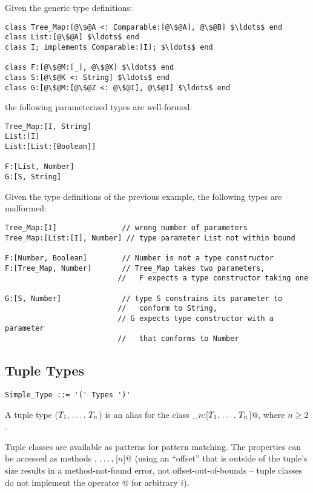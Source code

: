 \example
\label{example:parameterized-types}
Given the generic type definitions: 

\begin{lstlisting}[escapechar=@]
class Tree_Map:[@\$@A <: Comparable:[@\$@A], @\$@B] $\ldots$ end
class List:[@\$@A] $\ldots$ end
class I; implements Comparable:[I]; $\ldots$ end

class F:[@\$@M:[_], @\$@X] $\ldots$ end
class S:[@\$@K <: String] $\ldots$ end
class G:[@\$@M:[@\$@Z <: @\$@I], @\$@I] $\ldots$ end
\end{lstlisting}

the following parameterized types are well-formed: 

\begin{lstlisting}
Tree_Map:[I, String]
List:[I]
List:[List:[Boolean]]

F:[List, Number]
G:[S, String]
\end{lstlisting}

\example
\label{example:parameterized-types-mal}

Given the type definitions of the previous example, the following types are malformed: 

\begin{lstlisting}
Tree_Map:[I]               // wrong number of parameters
Tree_Map:[List:[I], Number] // type parameter List not within bound

F:[Number, Boolean]        // Number is not a type constructor
F:[Tree_Map, Number]       // Tree_Map takes two parameters, 
                          //   F expects a type constructor taking one

G:[S, Number]              // type S constrains its parameter to
                          //   conform to String, 
                          // G expects type constructor with a parameter
                          //   that conforms to Number
\end{lstlisting}

\subsection{Tuple Types}

\syntax\begin{lstlisting}
Simple_Type ::= '(' Types ')'
\end{lstlisting}

A tuple type ($T_1 ,\, \ldots ,\, T_n$) is an alias for the class \lstinline@Tuple_$n$:[$T_1 ,\, \ldots ,\, T_n$]@, where $n \geq 2$. 

Tuple classes are available as patterns for pattern matching. The properties can be accessed as methods \lstinline@[1]$ ,\, \ldots ,\, $[$n$]@ (using an ``offset'' that is outside of the tuple's size results in a method-not-found error, not offset-out-of-bounds -- tuple classes do not implement the operator \lstinline@[i]@ for arbitrary $i$). 

